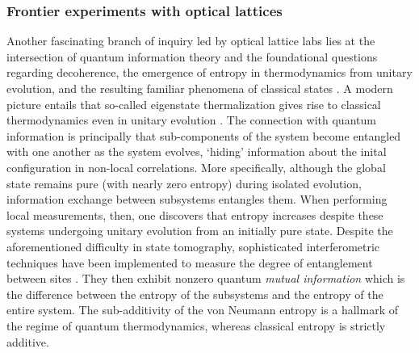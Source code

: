 \subsubsection{Frontier experiments with optical lattices}
	Another fascinating branch of inquiry led by optical lattice labs lies at the intersection of quantum information theory and the foundational questions regarding decoherence, the emergence of entropy in thermodynamics from unitary evolution, and the resulting familiar phenomena of classical states \cite{Osborne02,Osterloh02,Isakov11,Jiang12,Dalessio16,Goold16,Srednicki94,Amico08,Eisert15}.
	A modern picture entails that so-called eigenstate thermalization gives rise to classical thermodynamics even in unitary evolution \cite{Srednicki94,Dalessio16,Goold16}.
	The connection with quantum information is principally that sub-components of the system become entangled with one another as the system evolves, `hiding' information about the inital configuration in non-local correlations.
	More specifically, although the global state remains pure (with nearly zero entropy) during isolated evolution, information exchange between subsystems entangles them.
	When performing local measurements, then, one discovers that entropy increases despite these systems undergoing unitary evolution from an initially pure state.
	Despite the aforementioned difficulty in state tomography, sophisticated interferometric techniques have been implemented to measure the degree of entanglement between sites \cite{Brydges19,Daley12,Mouraalves04,Palmer05}.
	They then exhibit nonzero quantum \emph{mutual information} which is the difference between the entropy of the subsystems and the entropy of the entire system.
	The sub-additivity of the von Neumann entropy is a hallmark of the regime of quantum thermodynamics, whereas classical entropy is strictly additive.
	
